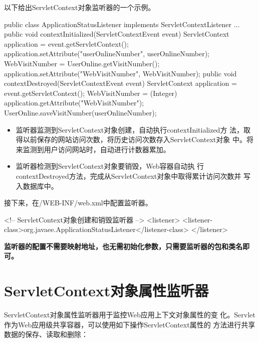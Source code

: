 以下给出ServletContext对象监听器的一个示例。


\begin{javaCode}
  public class ApplicationStatusListener implements ServletContextListener {
    ...
    public void contextInitialized(ServletContextEvent event) {
      ServletContext application = event.getServletContext();
      application.setAttribute("userOnlineNumber", userOnlineNumber);
      WebVisitNumber = UserOnline.getVisitNumber();
      application.setAttribute("WebVisitNumber", WebVisitNumber);
    }
    public void contextDestroyed(ServletContextEvent event) {
      ServletContext application = event.getServletContext();
      WebVisitNumber = (Integer) application.getAttribute("WebVisitNumber");
      UserOnline.saveVisitNumber(userOnlineNumber);
    }
  }  
\end{javaCode}

\begin{itemize}\kai
\item 监听器监测到ServletContext对象创建，自动执行contextInitialized方
  法，取得以前保存的网站访问次数，将历史访问次数存入ServletContext对象
  中。将来监测到用户访问网站时，自动进行计数器累加。
\item 监听器检测到ServletContext对象要销毁，Web容器自动执
  行contextDestroyed方法，完成从ServletContext对象中取得累计访问次数并
  写入数据库中。
\end{itemize}


接下来，在/WEB-INF/web.xml中配置监听器。


\begin{xmlCode}
  <!-- ServletContext对象创建和销毁监听器 -->
  <listener>  
    <listener-class>org.javaee.ApplicationStatusListener</listener-class>
  </listener>  
\end{xmlCode}


{\bf\Red 监听器的配置不需要映射地址，也无需初始化参数，只需要监听器的包和类名即可。}

\section{ServletContext对象属性监听器}

ServletContext对象属性监听器用于监控Web应用上下文对象属性的变
化。Servlet作为Web应用级共享容器，可以使用如下操作ServletContext属性的
方法进行共享数据的保存、读取和删除：

